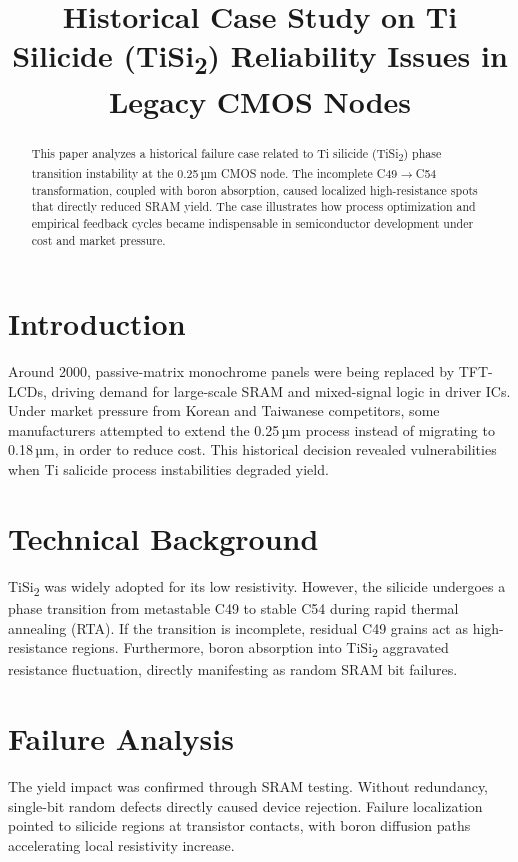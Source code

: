 \documentclass[conference]{IEEEtran}
\title{Historical Case Study on Ti Silicide (TiSi\textsubscript{2}) Reliability Issues in Legacy CMOS Nodes}
\author{
\IEEEauthorblockN{Shinichi Samizo}
\IEEEauthorblockA{Independent Semiconductor Researcher\\
Project Design Hub, Samizo-AITL\\
\textit{Email:} \href{mailto:shin3t72@gmail.com}{shin3t72@gmail.com}\quad
\textit{GitHub:} \href{https://github.com/Samizo-AITL}{Samizo-AITL}}
}
\begin{document}
\maketitle

\begin{abstract}
This paper analyzes a historical failure case related to Ti silicide (TiSi\textsubscript{2}) phase transition instability at the 0.25\,µm CMOS node. 
The incomplete C49$\rightarrow$C54 transformation, coupled with boron absorption, caused localized high-resistance spots that directly reduced SRAM yield. 
The case illustrates how process optimization and empirical feedback cycles became indispensable in semiconductor development under cost and market pressure.
\end{abstract}

\section{Introduction}
Around 2000, passive-matrix monochrome panels were being replaced by TFT-LCDs, driving demand for large-scale SRAM and mixed-signal logic in driver ICs. 
Under market pressure from Korean and Taiwanese competitors, some manufacturers attempted to extend the 0.25\,µm process instead of migrating to 0.18\,µm, in order to reduce cost. 
This historical decision revealed vulnerabilities when Ti salicide process instabilities degraded yield.

\section{Technical Background}
TiSi\textsubscript{2} was widely adopted for its low resistivity. 
However, the silicide undergoes a phase transition from metastable C49 to stable C54 during rapid thermal annealing (RTA). 
If the transition is incomplete, residual C49 grains act as high-resistance regions. 
Furthermore, boron absorption into TiSi\textsubscript{2} aggravated resistance fluctuation, directly manifesting as random SRAM bit failures.

\section{Failure Analysis}
The yield impact was confirmed through SRAM testing. 
Without redundancy, single-bit random defects directly caused device rejection. 
Failure localization pointed to silicide regions at transistor contacts, with boron diffusion paths accelerating local resistivity increase.
\end{document}
